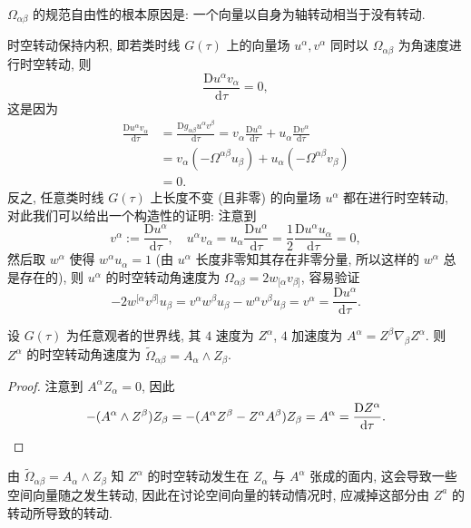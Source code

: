 \begin{remark}
	$\Omega_{\alpha\beta}$ 的规范自由性的根本原因是: 一个向量以自身为轴转动相当于没有转动.
\end{remark}

时空转动保持内积, 即若类时线 $G(\tau)$ 上的向量场 $u^\alpha,v^\alpha$ 同时以 $\Omega_{\alpha\beta}$ 为角速度进行时空转动, 则
\[ \frac{\mathrm{D} u^\alpha v_\alpha}{\mathrm{d} \tau}=0, \]
这是因为 
\begin{align*}
	\frac{\mathrm{D} u^\alpha v_\alpha}{\mathrm{d} \tau}&=\frac{\mathrm{D} g_{\alpha\beta}u^\alpha v^\beta}{\mathrm{d} \tau}=v_\alpha\frac{\mathrm{D} u^\alpha}{\mathrm{d} \tau}+u_\alpha\frac{\mathrm{D} v^\alpha}{\mathrm{d} \tau}\\
	&=v_\alpha(-\Omega^{\alpha\beta}u_\beta)+u_\alpha(-\Omega^{\alpha\beta}v_\beta)\\
	&=0.
\end{align*}
反之, 任意类时线 $G(\tau)$ 上长度不变 (且非零) 的向量场 $u^\alpha$ 都在进行时空转动, 对此我们可以给出一个构造性的证明: 注意到
\[ v^\alpha:=\frac{\mathrm{D}u^\alpha}{\mathrm{d}\tau},\quad u^{\alpha}v_{\alpha}=u_\alpha\frac{\mathrm{D}u^\alpha}{\mathrm{d}\tau}=\frac{1}{2}\frac{\mathrm{D}u^\alpha u_\alpha}{\mathrm{d}\tau}=0, \] 
然后取 $w^\alpha$ 使得 $w^\alpha u_\alpha=1$ (由 $u^{\alpha}$ 长度非零知其存在非零分量, 所以这样的 $w^\alpha$ 总是存在的), 则 $u^{\alpha}$ 的时空转动角速度为 $\Omega_{\alpha\beta}=2w_{[\alpha}v_{\beta]}$, 容易验证
\[ -2w^{[\alpha}v^{\beta]}u_\beta=v^{\alpha}w^{\beta}u_{\beta}-w^{\alpha}v^{\beta}u_{\beta}=v^{\alpha}=\frac{\mathrm{D}u^\alpha}{\mathrm{d}\tau}. \] 

\begin{proposition}
	\label{AZ}
	设 $G(\tau)$ 为任意观者的世界线, 其 $4$ 速度为 $Z^\alpha$, $4$ 加速度为 $A^\alpha=Z^\beta\nabla_\beta Z^\alpha$. 则 $Z^\alpha$ 的时空转动角速度为 $\tilde{\Omega}_{\alpha\beta}=A_\alpha\wedge Z_\beta$.
\end{proposition}
\begin{proof}
	注意到 $A^\alpha Z_\alpha=0$, 因此
	\[ -(A^\alpha\wedge Z^\beta)Z_\beta = -(A^\alpha Z^\beta-Z^\alpha A^\beta)Z_\beta=A^\alpha=\frac{\mathrm{D}Z^\alpha}{\mathrm{d}\tau}.\qedhere \]
\end{proof}

由 $\tilde{\Omega}_{\alpha\beta}=A_\alpha\wedge Z_\beta$ 知 $Z^\alpha$ 的时空转动发生在 $Z_\alpha$ 与 $A^\alpha$ 张成的面内, 这会导致一些空间向量随之发生转动, 因此在讨论空间向量的转动情况时, 应减掉这部分由 $Z^a$ 的转动所导致的转动.

